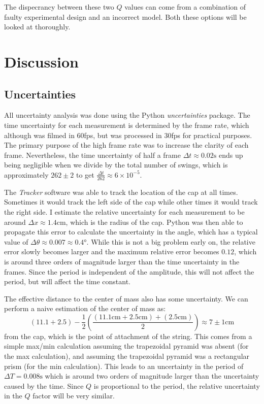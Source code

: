 \documentclass[%
 reprint,
 amsmath,amssymb
 aps,
]{revtex4-2}
\begin{document}
The dispecrancy between these two $Q$ values can come from a combination of faulty experimental design and an incorrect model. Both these options will be looked at thoroughly.

\section{Discussion}
\subsection{Uncertainties}
All uncertainty analysis was done using the Python \textit{uncertainties} package\cite{uncertainties}. The time uncertainty for each measurement is determined by the frame rate, which although was filmed in 60fps, but was processed in 30fps for practical purposes. The primary purpose of the high frame rate was to increase the clarity of each frame. Nevertheless, the time uncertainty of half a frame $\Delta t \approx 0.02\si{\second}$ ends up being negligible when we divide by the total number of swings, which is approximately $262\pm 2$ to get $\frac{\Delta t}{262}\approx 6 \times 10^{-5}$.

The \textit{Tracker} software was able to track the location of the cap at all times. Sometimes it would track the left side of the cap while other times it would track the right side. I estimate the relative uncertainty for each measurement to be around $\Delta x \approx 1.4\si{\centi\meter}$, which is the radius of the cap. Python was then able to propagate this error to calculate the uncertainty in the angle, which has a typical value of $\Delta \theta \approx 0.007 \approx 0.4\si{\degree}$. While this is not a big problem early on, the relative error slowly becomes larger and the maximum relative error becomes $0.12$, which is around three orders of magnitude larger than the time uncertainty in the frames. Since the period is independent of the amplitude, this will not affect the period, but will affect the time constant.

The effective distance to the center of mass also has some uncertainty. We can perform a naive estimation of the center of mass as:
\begin{equation}
    (11.1+2.5) - \frac{1}{2}\left(\frac{(11.1\si{\centi\meter} + 2.5 \si{\centi\meter})+(2.5\si{\centi\meter})}{2}\right) \approx 7 \pm 1\si{\centi\meter}
    \label{eq:}
\end{equation}
from the cap, which is the point of attachment of the string. This comes from a simple max/min calculation assuming the trapezoidal pyramid was absent (for the max calculation), and assuming the trapezoidal pyramid was a rectangular prism (for the min calculation). This leads to an uncertainty in the period of $\Delta T = 0.008\si{\second}$ which is around two orders of magnitude larger than the uncertainty caused by the time. Since $Q$ is proportional to the period, the relative uncertainty in the $Q$ factor will be very similar.
\end{document}
